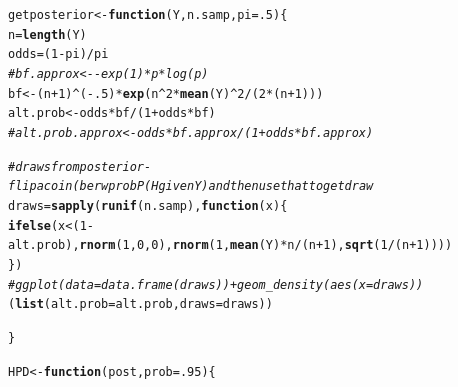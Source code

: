 \documentclass[AMA,STIX1COL]{WileyNJD-v2}\usepackage[]{graphicx}\usepackage[]{color}
\makeatletter
\newcommand{\hlnum}[1]{\textcolor[rgb]{0.686,0.059,0.569}{#1}}%
\newcommand{\hlcom}[1]{\textcolor[rgb]{0.678,0.584,0.686}{\textit{#1}}}%
\newcommand{\hlopt}[1]{\textcolor[rgb]{0,0,0}{#1}}%
\newcommand{\hlstd}[1]{\textcolor[rgb]{0.345,0.345,0.345}{#1}}%
\newcommand{\hlkwa}[1]{\textcolor[rgb]{0.161,0.373,0.58}{\textbf{#1}}}%
\newcommand{\hlkwb}[1]{\textcolor[rgb]{0.69,0.353,0.396}{#1}}%
\newcommand{\hlkwc}[1]{\textcolor[rgb]{0.333,0.667,0.333}{#1}}%
\newcommand{\hlkwd}[1]{\textcolor[rgb]{0.737,0.353,0.396}{\textbf{#1}}}%
\newenvironment{kframe}{%
 \def\at@end@of@kframe{}%
 \ifinner\ifhmode%
  \def\at@end@of@kframe{\end{minipage}}%
  \begin{minipage}{\columnwidth}%
 \fi\fi%
 \def\FrameCommand##1{\hskip\@totalleftmargin \hskip-\fboxsep
 \colorbox{shadecolor}{##1}\hskip-\fboxsep
     \hskip-\linewidth \hskip-\@totalleftmargin \hskip\columnwidth}%
 \MakeFramed {\advance\hsize-\width
   \@totalleftmargin\z@ \linewidth\hsize
   \@setminipage}}%
 {\par\unskip\endMakeFramed%
 \at@end@of@kframe}
\newenvironment{knitrout}{}{} %
\makeatother
\begin{document}
\begin{knitrout}
\color{fgcolor}\begin{kframe}
\begin{alltt}
\hlstd{getposterior} \hlkwb{<-} \hlkwa{function}\hlstd{(}\hlkwc{Y}\hlstd{,}\hlkwc{n.samp}\hlstd{,} \hlkwc{pi} \hlstd{=} \hlnum{.5}\hlstd{)\{}
  \hlstd{n} \hlkwb{=} \hlkwd{length}\hlstd{(Y)}
  \hlstd{odds} \hlkwb{=} \hlstd{(}\hlnum{1}\hlopt{-}\hlstd{pi)}\hlopt{/}\hlstd{pi}
  \hlcom{#bf.approx <- -exp(1)*p*log(p)}
  \hlstd{bf} \hlkwb{<-}  \hlstd{(n}\hlopt{+}\hlnum{1}\hlstd{)}\hlopt{^}\hlstd{(}\hlopt{-}\hlnum{.5}\hlstd{)}\hlopt{*}\hlkwd{exp}\hlstd{(n}\hlopt{^}\hlnum{2}\hlopt{*}\hlkwd{mean}\hlstd{(Y)}\hlopt{^}\hlnum{2}\hlopt{/}\hlstd{(}\hlnum{2}\hlopt{*}\hlstd{(n}\hlopt{+}\hlnum{1}\hlstd{)))}
  \hlstd{alt.prob} \hlkwb{<-} \hlstd{odds}\hlopt{*}\hlstd{bf}\hlopt{/}\hlstd{(}\hlnum{1}\hlopt{+}\hlstd{odds}\hlopt{*}\hlstd{bf)}
  \hlcom{#alt.prob.approx <- odds*bf.approx/(1+odds*bf.approx)}

  \hlcom{#draws from posterior-flip a coin (ber w prob P(H given Y) and then use that to get draw}
  \hlstd{draws} \hlkwb{=} \hlkwd{sapply}\hlstd{(}\hlkwd{runif}\hlstd{(n.samp),} \hlkwa{function}\hlstd{(}\hlkwc{x}\hlstd{)  \{}
    \hlkwd{ifelse}\hlstd{(x}\hlopt{<}\hlstd{(}\hlnum{1}\hlopt{-}\hlstd{alt.prob),} \hlkwd{rnorm}\hlstd{(}\hlnum{1}\hlstd{,} \hlnum{0}\hlstd{,} \hlnum{0}\hlstd{),} \hlkwd{rnorm}\hlstd{(}\hlnum{1}\hlstd{,}\hlkwd{mean}\hlstd{(Y)}\hlopt{*}\hlstd{n}\hlopt{/}\hlstd{(n}\hlopt{+}\hlnum{1}\hlstd{),} \hlkwd{sqrt}\hlstd{(}\hlnum{1}\hlopt{/}\hlstd{(n}\hlopt{+}\hlnum{1}\hlstd{))))}
  \hlstd{\})}
  \hlcom{#ggplot(data = data.frame(draws))+geom_density(aes(x=draws))}
  \hlstd{(}\hlkwd{list}\hlstd{(}\hlkwc{alt.prob}\hlstd{=alt.prob,} \hlkwc{draws}\hlstd{=draws))}

\hlstd{\}}

\hlstd{HPD} \hlkwb{<-}\hlkwa{function}\hlstd{(}\hlkwc{post}\hlstd{,} \hlkwc{prob}  \hlstd{=} \hlnum{.95}\hlstd{)\{}


\end{alltt}
\end{kframe}
\end{knitrout}
\end{document}
